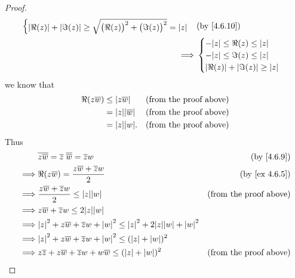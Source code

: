 \begin{proof}
\begin{align*}
\begin{cases}
                 \abs{\Re(z)} + \abs{\Im(z)} \geq \sqrt{\big(\Re(z)\big)^2 + \big(\Im(z)\big)^2} = \abs{z}
               \end{cases}                                                    & \text{(by \cref{4.6.10})}                                                  \\
    \implies & \begin{cases}
                 -\abs{z} \leq \Re(z) \leq \abs{z} \\
                 -\abs{z} \leq \Im(z) \leq \abs{z} \\
                 \abs{\Re(z)} + \abs{\Im(z)} \geq \abs{z}
               \end{cases}
  \end{align*}
  we know that
  \begin{align*}
    \Re(z \overline{w}) & \leq \abs{z \overline{w}}    & \text{(from the proof above)} \\
                        & = \abs{z} \abs{\overline{w}} & \text{(from the proof above)} \\
                        & = \abs{z} \abs{w}.           & \text{(from the proof above)}
  \end{align*}
  Thus
  \begin{align*}
             & \overline{z \overline{w}} = \overline{z} \; \overline{\overline{w}} = \overline{z} w                   & \text{(by \cref{4.6.9})}               \\
    \implies & \Re(z \overline{w}) = \frac{z \overline{w} + \overline{z} w}{2}                                        & \text{(by \cref{ex 4.6.5})}            \\
    \implies & \frac{z \overline{w} + \overline{z} w}{2} \leq \abs{z} \abs{w}                                         & \text{(from the proof above)}          \\
    \implies & z \overline{w} + \overline{z} w \leq 2 \abs{z} \abs{w}                                                                                          \\
    \implies & \abs{z}^2 + z \overline{w} + \overline{z} w + \abs{w}^2 \leq \abs{z}^2 + 2 \abs{z} \abs{w} + \abs{w}^2                                          \\
    \implies & \abs{z}^2 + z \overline{w} + \overline{z} w + \abs{w}^2 \leq (\abs{z} + \abs{w})^2                                                              \\
    \implies & z \overline{z} + z \overline{w} + \overline{z} w + w \overline{w} \leq (\abs{z} + \abs{w})^2           & \text{(from the proof above)}          \\

\end{align*}
\end{proof}
